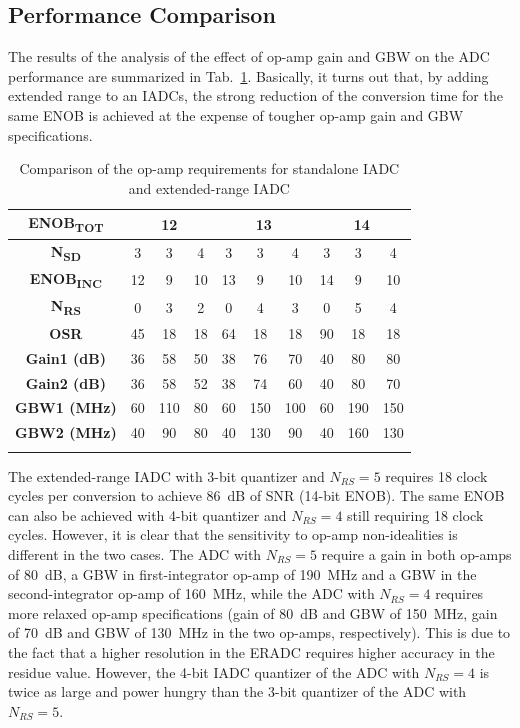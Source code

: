\subsection{Performance Comparison}
The results of the analysis of the effect of op-amp gain and GBW on the ADC performance are summarized in Tab.~\ref{COMPARISON}. Basically, it turns out that, by adding extended range to an IADCs, the strong reduction of the conversion time for the same ENOB is achieved at the expense of tougher op-amp gain and GBW specifications.
\begin{table}[h]
\centering
\begin{tabular}{c|c|c|c|c|c|c|c|c|c}
\Xhline{4\arrayrulewidth}
\textbf{ENOB\textsubscript{TOT}} & \multicolumn{3}{c|}{\textbf{12}} & \multicolumn{3}{c|}{\textbf{13}} & \multicolumn{3}{c}{\textbf{14}} \\ \hline
\textbf{N\textsubscript{SD}} & 3 & 3 & 4 & 3 & 3 & 4 & 3 & 3 & 4 \\ \hline
\textbf{ENOB\textsubscript{INC}} & 12 & 9 & 10 & 13 & 9 & 10 & 14 & 9 & 10 \\ \hline
\textbf{N\textsubscript{RS}} & 0 & 3 & 2 & 0 & 4 & 3 & 0 & 5 & 4 \\ \hline
\textbf{OSR} & 45 & 18 & 18 & 64 & 18 & 18 & 90 & 18 & 18 \\ \hline
\textbf{Gain1 (dB)} & 36 & 58 & 50 & 38 & 76 & 70 & 40 & 80 & 80 \\ \hline
\textbf{Gain2 (dB)} & 36 & 58 & 52 & 38 & 74 & 60 & 40 & 80 & 70 \\ \hline
\textbf{GBW1 (MHz)} & 60 & 110 & 80 & 60 & 150 & 100 & 60 & 190 & 150 \\ \hline
\textbf{GBW2 (MHz)} & 40 & 90 & 80 & 40 & 130 & 90 & 40 & 160 & 130 \\ \Xhline{4\arrayrulewidth}
\end{tabular}
\caption{Comparison of the op-amp requirements for standalone IADC and extended-range IADC}
\label{COMPARISON}
\end{table}


The extended-range IADC with 3-bit quantizer and $N_{RS}=5$ requires 18 clock cycles per conversion to achieve 86~dB of SNR (14-bit ENOB). The same ENOB can also be achieved with 4-bit quantizer and $N_{RS}=4$ still requiring 18 clock cycles. However, it is clear that the sensitivity to op-amp non-idealities is different in the two cases. The ADC with $N_{RS}=5$ require a gain in both op-amps of 80~dB, a GBW in first-integrator op-amp of 190~MHz and a GBW in the second-integrator op-amp of 160~MHz, while the ADC with $N_{RS}=4$ requires more relaxed op-amp specifications (gain of 80~dB and GBW of 150~MHz, gain of 70~dB and GBW of 130~MHz in the two op-amps, respectively). This is due to the fact that a higher resolution in the ERADC requires higher accuracy in the residue value. However, the 4-bit IADC quantizer of the ADC with $N_{RS}=4$ is twice as large and power hungry than the 3-bit quantizer of the ADC with $N_{RS}=5$.


